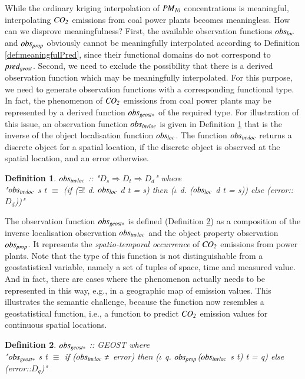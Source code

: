 \documentclass[final,authoryear,1p,times]{elsarticle}
\newtheorem{definition}{Definition}
\begin{document}
While the ordinary kriging interpolation of ${\it PM_{10}}$ concentrations is meaningful, interpolating ${\it CO_2}$ emissions from coal power plants becomes meaningless. How can we disprove meaningfulness? First, the available observation functions ${\it obs_{loc}}$ and  ${\it obs_{prop}}$ obviously cannot be meaningfully interpolated according to Definition \ref{def:meaningfulPred}, since their functional domains do not correspond to ${\it pred_{geost}}$. Second, we need to exclude the possibility that there is a derived observation function which may be meaningfully interpolated. For this purpose, we need to generate observation functions with a corresponding functional type.
In fact, the phenomenon of ${\it CO_2}$ emissions from coal power plants may be represented by a derived function ${\it obs_{geost*}}$ of the required type. For illustration of this issue, an observation function ${\it obs_{invloc}}$ is given in Definition \ref{def:obsInvLoc} that is the inverse of the object localisation function ${\it obs_{loc}}$. The function ${\it obs_{invloc}}$ returns a discrete object for a spatial location, if the discrete object is observed at the spatial location, and an error otherwise.

\begin{definition}
\label{def:obsInvLoc}
 ${\it obs_{invloc}}$ :: "$D_s \Rightarrow D_t \Rightarrow D_d$" where \\
 "${\it obs_{invloc}}$ s t $\equiv$ (if ($\exists!$ d. ${\it obs_{loc}}$ d t = s) then ($\iota$ d. (${\it obs_{loc}}$ d t = s)) else (error::$D_d$))"
\end{definition}

The observation function ${\it obs_{geost*}}$ is defined (Definition \ref{def:pseudoGeost}) as a composition of the inverse localisation observation ${\it obs_{invloc}}$ and the object property observation ${\it obs_{prop}}$. It represents the \textit{spatio-temporal occurrence} of ${\it CO_2}$ emissions from power plants. Note that the type of this function is not distinguishable from a geostatistical variable, namely a set of tuples of space, time and measured value. And in fact, there are cases where the phenomenon actually needs to be represented in this way, e.g., in a geographic map of emission values. This illustrates the semantic challenge, because the function now resembles a geostatistical function, i.e., a function to predict ${\it CO_2}$ emission values for continuous spatial locations. 
\begin{definition}
\label{def:pseudoGeost}
${\it obs_{geost*}}$ :: GEOST where \\
"${\it obs_{geost*}}$ s t $\equiv$ if (${\it obs_{invloc}} \neq$ error) then ($\iota$ q. ${\it obs_{prop}}$(${\it obs_{invloc}}$ s t) t = q) else (error::$D_q$)"
\end{definition}
\end{document}
